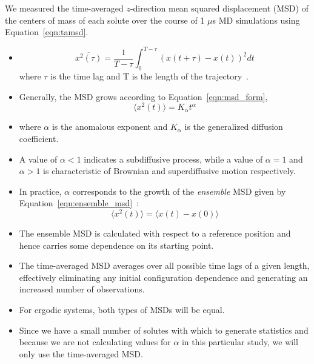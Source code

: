 \documentclass{article}
\begin{document}
  \noindent We measured the time-averaged $z$-direction mean squared 
  displacement (MSD) of the centers of mass of each solute over the 
  course of 1 $\mu$s MD simulations using Equation~\ref{eqn:tamsd}.
  \begin{itemize}
    \item \begin{equation}
	\overline{x^2(\tau)} = \dfrac{1}{T - \tau}\int_{0}^{T - \tau} (x(t + \tau) - x(t))^2 dt
	\label{eqn:tamsd}
	\end{equation}
	where $\tau$ is the time lag and T is the length of the
	trajectory~\cite{meroz_toolbox_2015}. 
	\item Generally, the MSD grows according to Equation~\ref{eqn:msd_form},
	\begin{equation} 
	\langle x^2(t) \rangle = K_{\alpha}t^\alpha
	\label{eqn:msd_form}
	\end{equation} 
	\item where $\alpha$ is the anomalous exponent and $K_\alpha$ is the
	generalized diffusion coefficient.
	\item A value of $\alpha < 1$ indicates a subdiffusive process, while a value of
	$\alpha = 1$ and $\alpha > 1$ is characteristic of Brownian and superdiffusive
	motion respectively.
	\item In practice, $\alpha$ corresponds to the growth of the \textit{ensemble}
	MSD given by Equation~\ref{eqn:ensemble_msd}~\cite{meroz_toolbox_2015}:
	\begin{equation}
	\langle x^2(t) \rangle = \langle x(t) - x(0) \rangle
	\label{eqn:ensemble_msd}
	\end{equation}
	\item The ensemble MSD is calculated with respect to a reference position and
	hence carries some dependence on its starting point.
	\item The time-averaged MSD averages over all possible time lags of a given 
	length, effectively eliminating any initial configuration dependence and generating
	an increased number of observations. 
	\item For ergodic systems, both types of MSDs will be equal.
	\item Since we have a small number of solutes with which to generate statistics
	and because we are not calculating values for $\alpha$ in this particular study,
	we will only use the time-averaged MSD.
  \end{itemize}  
  
\end{document}

